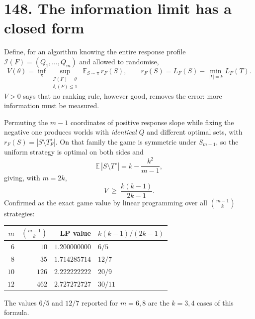 \documentclass[9pt,twocolumn]{article}
\renewcommand{\_}{\CIGunderscore\allowbreak}
\begin{document}
\section*{148. The information limit has a closed form}
Define, for an algorithm knowing the entire response profile $\mathcal I(F)=(Q_1,\dots,Q_m)$ and allowed to randomise,
\[V(\theta)=\inf_{\pi}\ \sup_{\substack{\mathcal I(F)=\theta\\ \delta_\square(F)\le1}}\ \mathbb E_{S\sim\pi}\,r_F(S),\qquad r_F(S)=L_F(S)-\min_{|T|=k}L_F(T).\]
$V>0$ says that no ranking rule, however good, removes the error: more information must be measured.

Permuting the $m-1$ coordinates of positive response slope while fixing the negative one produces worlds with \emph{identical} $Q$ and different optimal sets, with $r_F(S)=|S\setminus T_F^\star|$. On that family the game is symmetric under $S_{m-1}$, so the uniform strategy is optimal on both sides and
\[\mathbb E\,|S\setminus T^\star| = k-\frac{k^2}{m-1},\]
giving, with $m=2k$,
\[\boxed{\ V\ \ge\ \frac{k(k-1)}{2k-1}.\ }\]
Confirmed as the exact game value by linear programming over all $\binom{m-1}{k}$ strategies:
\begin{center}\scriptsize
\begin{tabularx}{0.98\columnwidth}{r r r X}
\toprule
$m$ & $\binom{m-1}{k}$ & LP value & $k(k-1)/(2k-1)$\\
\midrule
$6$ & $10$ & $1.200000000$ & $6/5$\\
$8$ & $35$ & $1.714285714$ & $12/7$\\
$10$ & $126$ & $2.222222222$ & $20/9$\\
$12$ & $462$ & $2.727272727$ & $30/11$\\
\bottomrule
\end{tabularx}
\end{center}
The values $6/5$ and $12/7$ reported for $m=6,8$ are the $k=3,4$ cases of this formula.
\end{document}
